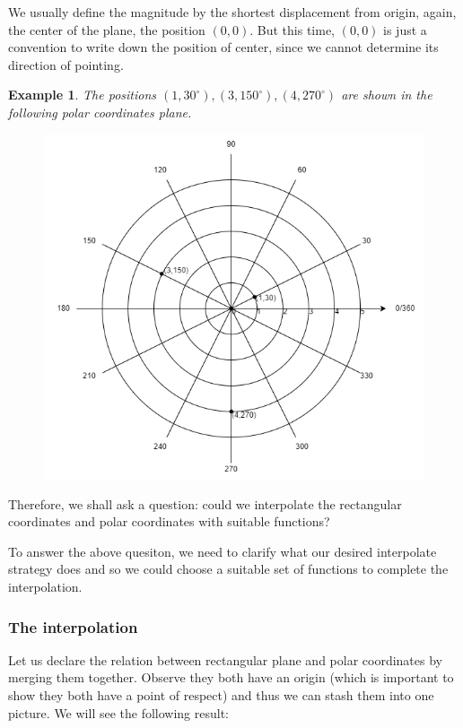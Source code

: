\documentclass[12pt]{article}
\newtheorem*{example}{Example}
\begin{document}
    We usually define the magnitude by the shortest displacement from origin, again, the center of the plane, the position $(0,0)$. But this time, $(0,0)$ is just a convention to write down the position of center, since we cannot determine its direction of pointing. 

    \begin{example}
        The positions $(1,30^\circ), (3,150^\circ), (4,270^\circ)$ are shown in the following polar coordinates plane.

        \begin{figure}[H]
            \centering
            \includegraphics[scale=0.8]{polar.png}
        \end{figure}
    \end{example}

    Therefore, we shall ask a question: could we interpolate the rectangular coordinates and polar coordinates with suitable functions?

    To answer the above quesiton, we need to clarify what our desired interpolate strategy does and so we could choose a suitable set of functions to complete the interpolation.

    \subsubsection*{The interpolation}

    Let us declare the relation between rectangular plane and polar coordinates by merging them together. Observe they both have an origin (which is important to show they both have a point of respect) and thus we can stash them into one picture. We will see the following result:
\end{document}
